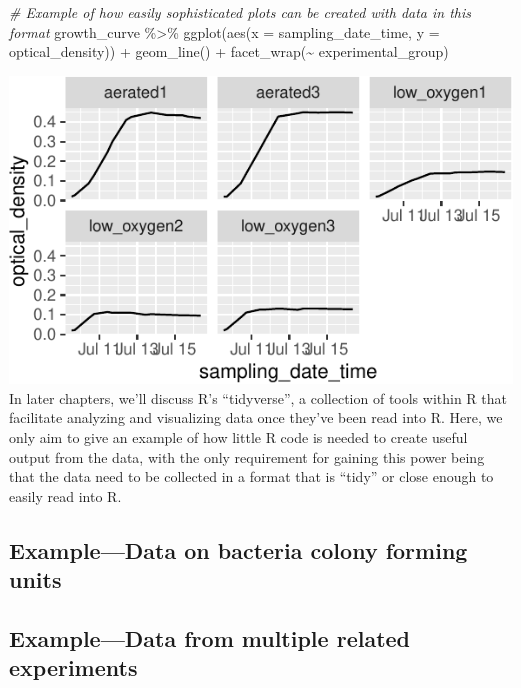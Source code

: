 \documentclass[]{tufte-book}
\newenvironment{Shaded}{}{}
\newcommand{\AttributeTok}[1]{\textcolor[rgb]{0.49,0.56,0.16}{#1}}
\newcommand{\CommentTok}[1]{\textcolor[rgb]{0.38,0.63,0.69}{\textit{#1}}}
\newcommand{\FunctionTok}[1]{\textcolor[rgb]{0.02,0.16,0.49}{#1}}
\newcommand{\NormalTok}[1]{#1}
\newcommand{\SpecialCharTok}[1]{\textcolor[rgb]{0.25,0.44,0.63}{#1}}
\begin{document}
\begin{Shaded}
\begin{Highlighting}[]
\CommentTok{\# Example of how easily sophisticated plots can be created with data in this format}
\NormalTok{growth\_curve }\SpecialCharTok{\%\textgreater{}\%} 
  \FunctionTok{ggplot}\NormalTok{(}\FunctionTok{aes}\NormalTok{(}\AttributeTok{x =}\NormalTok{ sampling\_date\_time, }\AttributeTok{y =}\NormalTok{ optical\_density)) }\SpecialCharTok{+} 
  \FunctionTok{geom\_line}\NormalTok{() }\SpecialCharTok{+} 
  \FunctionTok{facet\_wrap}\NormalTok{(}\SpecialCharTok{\textasciitilde{}}\NormalTok{ experimental\_group)}
\end{Highlighting}
\end{Shaded}

\includegraphics{improve_repro_files/figure-latex/unnamed-chunk-3-1}
In later chapters, we'll discuss R's ``tidyverse'', a collection of tools within R
that facilitate analyzing and visualizing data once they've been read into R. Here, we
only aim to give an example of how little R code is needed to create useful output from
the data, with the only requirement for gaining this power being that the data need to
be collected in a format that is ``tidy'' or close enough to easily read into R.

\hypertarget{exampledata-on-bacteria-colony-forming-units}{%
\subsection{Example---Data on bacteria colony forming units}\label{exampledata-on-bacteria-colony-forming-units}}

\hypertarget{exampledata-from-multiple-related-experiments}{%
\subsection{Example---Data from multiple related experiments}\label{exampledata-from-multiple-related-experiments}}
\end{document}
